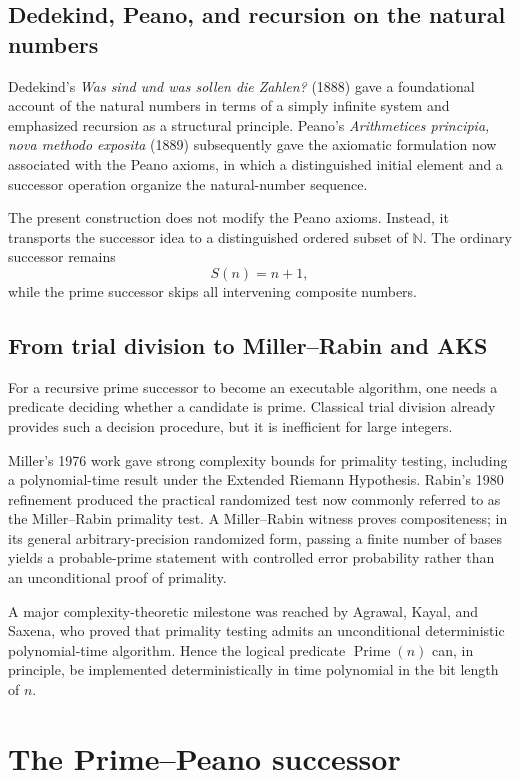 \documentclass[11pt]{article}
\theoremstyle{definition}
\newcommand{\N}{\mathbb{N}}
\newcommand{\Prime}{\operatorname{Prime}}
\begin{document}
\subsection{Dedekind, Peano, and recursion on the natural numbers}

Dedekind's \emph{Was sind und was sollen die Zahlen?} (1888) gave a foundational account of the natural numbers in terms of a simply infinite system and emphasized recursion as a structural principle. Peano's \emph{Arithmetices principia, nova methodo exposita} (1889) subsequently gave the axiomatic formulation now associated with the Peano axioms, in which a distinguished initial element and a successor operation organize the natural-number sequence.

The present construction does not modify the Peano axioms. Instead, it transports the successor idea to a distinguished ordered subset of $\N$. The ordinary successor remains
\[
S(n)=n+1,
\]
while the prime successor skips all intervening composite numbers.

\subsection{From trial division to Miller--Rabin and AKS}

For a recursive prime successor to become an executable algorithm, one needs a predicate deciding whether a candidate is prime. Classical trial division already provides such a decision procedure, but it is inefficient for large integers.

Miller's 1976 work gave strong complexity bounds for primality testing, including a polynomial-time result under the Extended Riemann Hypothesis. Rabin's 1980 refinement produced the practical randomized test now commonly referred to as the Miller--Rabin primality test. A Miller--Rabin witness proves compositeness; in its general arbitrary-precision randomized form, passing a finite number of bases yields a probable-prime statement with controlled error probability rather than an unconditional proof of primality.

A major complexity-theoretic milestone was reached by Agrawal, Kayal, and Saxena, who proved that primality testing admits an unconditional deterministic polynomial-time algorithm. Hence the logical predicate $\Prime(n)$ can, in principle, be implemented deterministically in time polynomial in the bit length of $n$.

\section{The Prime--Peano successor}
\end{document}
